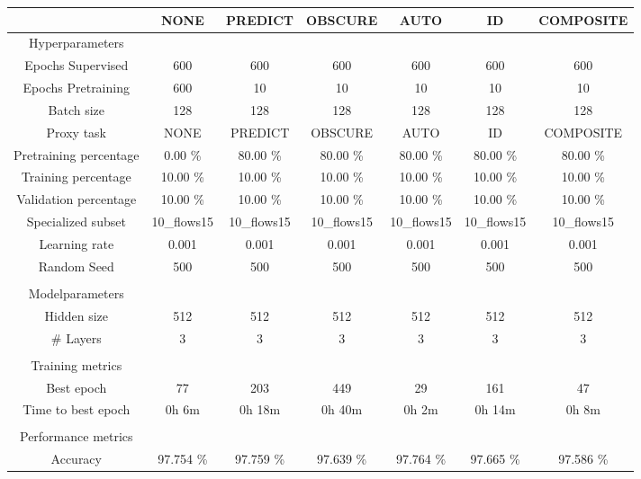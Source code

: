\begin{table}[htb]
    \centering
    \begin{tabular}{@{}ccccccc@{}}
        \toprule
         &  NONE &  PREDICT &  OBSCURE &  AUTO &  ID &  COMPOSITE \\
        \midrule
        Hyperparameters &  &  &  &  &  &  \\
        Epochs Supervised &  600 &  600 &  600 &  600 &  600 &  600 \\
        Epochs Pretraining &  600 &  10 &  10 &  10 &  10 &  10 \\
        Batch size &  128 &  128 &  128 &  128 &  128 &  128 \\
        Proxy task &  NONE &  PREDICT &  OBSCURE &  AUTO &  ID &  COMPOSITE \\
        Pretraining percentage &  0.00 \% &  80.00 \% &  80.00 \% &  80.00 \% &  80.00 \% &  80.00 \% \\
        Training percentage &  10.00 \% &  10.00 \% &  10.00 \% &  10.00 \% &  10.00 \% &  10.00 \% \\
        Validation percentage &  10.00 \% &  10.00 \% &  10.00 \% &  10.00 \% &  10.00 \% &  10.00 \% \\
        Specialized subset &  10\_flows15 &  10\_flows15 &  10\_flows15 &  10\_flows15 &  10\_flows15 &  10\_flows15 \\
        Learning rate &  0.001 &  0.001 &  0.001 &  0.001 &  0.001 &  0.001 \\
        Random Seed &  500 &  500 &  500 &  500 &  500 &  500 \\
         \\
        Modelparameters &  &  &  &  &  &  \\
        Hidden size &  512 &  512 &  512 &  512 &  512 &  512 \\
        \# Layers &  3 &  3 &  3 &  3 &  3 &  3 \\
         \\
        Training metrics &  &  &  &  &  &  \\
        Best epoch &  77 &  203 &  449 &  29 &  161 &  47 \\
        Time to best epoch &  0h 6m &  0h 18m &  0h 40m &  0h 2m &  0h 14m &  0h 8m \\
         \\
        Performance metrics &  &  &  &  &  &  \\
        Accuracy &  97.754 \% &  97.759 \% &  97.639 \% &  97.764 \% &  97.665 \% &  97.586 \% \\

\end{tabular}
\end{table}
